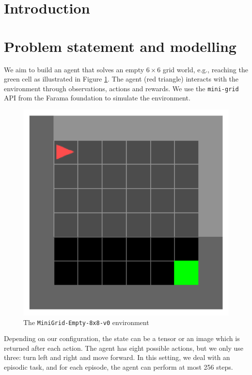 \newcommand{\bydef}{\overset{\scriptscriptstyle\Delta}{=}}
\newcommand{\EE}{\mathbb{E}}
\newcommand{\PP}{\mathbb{P}}
\begin{abstract}

\end{abstract}

\section{Introduction}

\section{Problem statement and modelling}
We aim to build an agent that solves an empty  $6\times6$ grid world, e.g., reaching the green cell as illustrated in Figure \ref{fig:mini-grid}. The agent (red triangle) interacts with the environment through observations, actions and rewards. We use the \texttt{mini-grid} API from the Farama foundation to simulate the environment.
\begin{figure}[H]
	\centering
	\includegraphics[width=0.9\linewidth]{figures/grid_world.pdf}
	\caption{The \texttt{MiniGrid-Empty-8x8-v0} environment}
	\label{fig:mini-grid}
\end{figure}

Depending on our configuration, the state can be a tensor or an image which is returned after each action. The agent has eight possible actions, but we only use three: turn left and right and move forward. In this setting, we deal with an episodic task, and for each episode, the agent can perform at most 256 steps.

